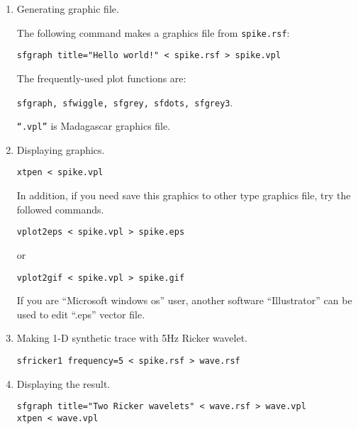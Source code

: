 \begin{enumerate}
{\begin{enumerate}
The file \texttt{spike.rsf} is a text header. The \emph{actual data}
are stored in the binary file pointed to by the \texttt{in=} parameter
in the header. You can look at the header file directly with
\texttt{more}, or better, examine the file properties with:
\begin{verbatim}
sfin spike.rsf
\end{verbatim}
You can learn more about the contents of \texttt{spike.rsf} with
\begin{verbatim}
sfattr < spike.rsf
\end{verbatim}

\item Generating graphic file.

The following command makes a graphics file from \texttt{spike.rsf}:
\begin{verbatim}
sfgraph title="Hello world!" < spike.rsf > spike.vpl
\end{verbatim}
The frequently-used plot functions are:

\texttt{sfgraph, sfwiggle, sfgrey, sfdots, sfgrey3}.

\texttt{``.vpl''} is Madagascar graphics file.

\item Displaying graphics.
\begin{verbatim}
xtpen < spike.vpl
\end{verbatim}

In addition, if you need save this graphics to other type graphics file,
try the followed commands.
\begin{verbatim}
vplot2eps < spike.vpl > spike.eps
\end{verbatim} 
or
\begin{verbatim}
vplot2gif < spike.vpl > spike.gif
\end{verbatim}

If you are ``Microsoft windows os'' user, another software ``Illustrator''
can be used to edit ``.eps'' vector file. 

\item Making 1-D synthetic trace with 5Hz Ricker wavelet.
\begin{verbatim}
sfricker1 frequency=5 < spike.rsf > wave.rsf
\end{verbatim}

\item Displaying the result.
\begin{verbatim}
sfgraph title="Two Ricker wavelets" < wave.rsf > wave.vpl
xtpen < wave.vpl
\end{verbatim}


\end{enumerate}}
\end{enumerate}
